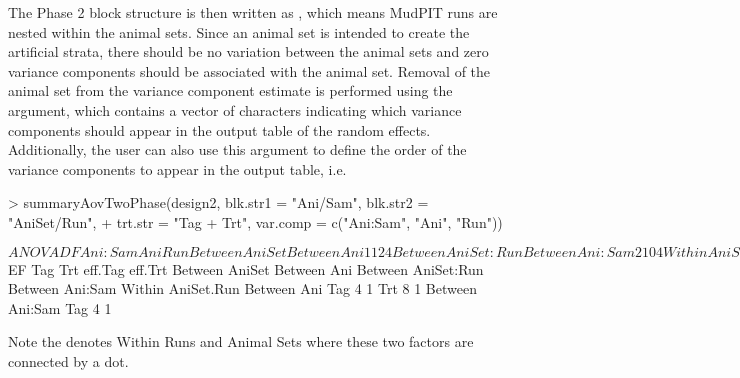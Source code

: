 \documentclass[article]{jss}
\begin{document}
The Phase 2 block structure is then written as , which means MudPIT runs are nested within the animal sets. Since an animal set is intended to create the artificial strata, there should be no variation between the animal sets and zero variance components should be associated with the animal set. Removal of the animal set from the variance component estimate is performed using the  argument, which contains a vector of characters indicating which variance components should appear in the output table of the random effects. Additionally, the user can also use this argument to define the order of the variance components to appear in the output table, i.e.
\begin{CodeChunk}
\begin{CodeInput}
> summaryAovTwoPhase(design2, blk.str1 = "Ani/Sam", blk.str2 = "AniSet/Run", 
+	trt.str = "Tag + Trt", var.comp = c("Ani:Sam", "Ani", "Run"))                                    
\end{CodeInput}
\begin{CodeOutput}
$ANOVA
                   DF Ani:Sam Ani Run
Between AniSet                       
   Between Ani     1  1       2   4  
Between AniSet:Run                   
   Between Ani:Sam 2  1       0   4  
Within AniSet.Run                    
   Between Ani                       
      Tag          1  1       2   0  
      Trt          1  1       2   0  
      Residual     4  1       2   0  
   Between Ani:Sam                   
      Tag          2  1       0   0  
      Residual     4  1       0   0  

$EF
                   Tag Trt eff.Tag eff.Trt
Between AniSet                            
   Between Ani                            
Between AniSet:Run                        
   Between Ani:Sam                        
Within AniSet.Run                         
   Between Ani                            
      Tag          4       1              
      Trt              8           1      
   Between Ani:Sam                        
      Tag          4       1              
\end{CodeOutput}
\end{CodeChunk}
Note the  denotes Within Runs and Animal Sets where these two factors are connected by a dot.  
\end{document}
